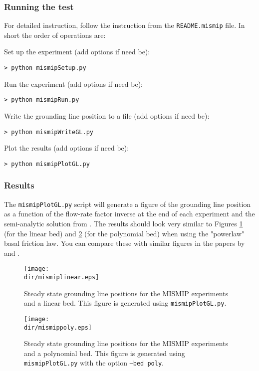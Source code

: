 \subsubsection{Running the test}
For detailed instruction, follow the instruction from the \texttt{README.mismip} file. In short the order of operations are:

\noindent 
Set up the experiment (add options if need be):

\texttt{> python mismipSetup.py}

\noindent
Run the experiment (add options if need be):

\texttt{> python mismipRun.py}

\noindent
Write the grounding line position to a file (add options if need be):

\texttt{> python mismipWriteGL.py}

\noindent
Plot the results (add options if need be):

\texttt{> python mismipPlotGL.py}


\subsubsection{Results}
The \texttt{mismipPlotGL.py} script will generate a figure of the grounding line position as a function of the flow-rate factor inverse at the end of each experiment and the semi-analytic solution from \citet{Schoof2007}.
The results should look very similar to Figures \ref{fig:mismiplinear} (for the linear bed) and \ref{fig:mismippoly} (for the polynomial bed) when using the "powerlaw" \citep{Schoof2007} basal friction law. You can compare these with similar figures in the papers by  \citet{Pattyn2012} and \citet{Leguy2014}.

\begin{figure}[H]
	\centering
	\texttt{[image: \\dir/mismiplinear.eps]}
	\caption{Steady state grounding line positions for the MISMIP experiments and a linear bed. This figure is generated using \texttt{mismipPlotGL.py}.}
	\label{fig:mismiplinear}
\end{figure}

\begin{figure}[H]
	\centering
	\texttt{[image: \\dir/mismippoly.eps]}
	\caption{Steady state grounding line positions for the MISMIP experiments and a polynomial bed. This figure is generated using \texttt{mismipPlotGL.py} with the option \texttt{--bed poly}.}
	\label{fig:mismippoly}
\end{figure}


